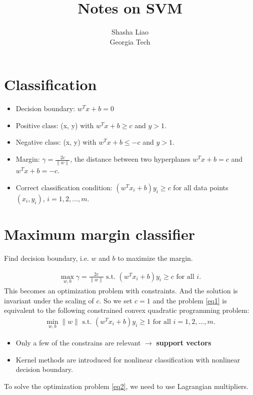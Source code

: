 \documentclass[twoside,12pt]{article}
\begin{document}
\title{Notes on SVM}
\author {Shasha Liao \\ Georgia Tech}
\maketitle
\section{Classification}
\begin{itemize}
\item Decision boundary: $w^Tx + b = 0$
\item Positive class: (x, y) with $w^Tx + b \geq c$ and $y > 1$.
\item Negative class:  (x, y) with $w^Tx + b \leq -c$ and $y > 1$.
\item Margin: $\gamma = \frac{2c}{\|w\|}$, the distance between two hyperplanes $w^Tx + b = c$ and $w^Tx + b = -c$.
\item Correct classification condition: $( w^Tx_i + b )y_i \geq c$ for all data points $(x_i, y_i)$, $i = 1, 2, ..., m.$
\end{itemize}

\section{Maximum margin classifier}
Find decision boundary, i.e. $w$ and $b$ to maximize the margin. 

\begin{align}\label{eq1}
\max_{w,b} \gamma = \frac{2c}{\|w\|} \text{ s.t. } ( w^Tx_i + b )y_i \geq c \text{ for all } i.
\end{align}
This becomes an optimization problem with constraints. And the solution is invariant under the scaling of $c$. So we set $c = 1$ and the problem \eqref{eq1} is equivalent to the following constrained convex quadratic programming problem:
\begin{align}\label{eq2}
\min_{w,b} \|w\| \text{ s.t. } ( w^Tx_i + b )y_i \geq 1 \text{ for all } i = 1, 2, ..., m.
\end{align}
\begin{itemize}
\item Only a few of the constrains are relevant $\rightarrow$ \textbf{support vectors}
\item Kernel methods are introduced for nonlinear classification with nonlinear decision boundary.
\end{itemize}

To solve the optimization problem \eqref{eq2}, we need to use Lagrangian multipliers. 
\end{document}
